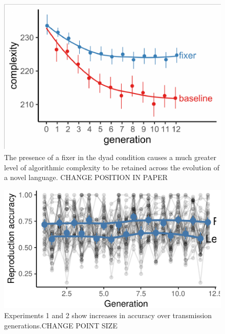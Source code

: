 \documentclass[10pt, letterpaper]{article}
\newenvironment{CodeChunk}{}{}
\begin{document}
\begin{CodeChunk}
\begin{figure}[tb]

{\centering \includegraphics{figs/both_complexity-1} 

}

\caption[The presence of a fixer in the dyad condition causes a much greater level of algorithmic complexity to be retained across the evolution of a novel language]{The presence of a fixer in the dyad condition causes a much greater level of algorithmic complexity to be retained across the evolution of a novel language. CHANGE POSITION IN PAPER}\label{fig:both_complexity}
\end{figure}
\end{CodeChunk}

\begin{CodeChunk}
\begin{figure}[tb]

{\centering \includegraphics{figs/e3_acc_plot-1} 

}

\caption[Experiments 1 and 2 show increases in accuracy over transmission generations.CHANGE POINT SIZE]{Experiments 1 and 2 show increases in accuracy over transmission generations.CHANGE POINT SIZE}\label{fig:e3_acc_plot}
\end{figure}
\end{CodeChunk}
\end{document}
